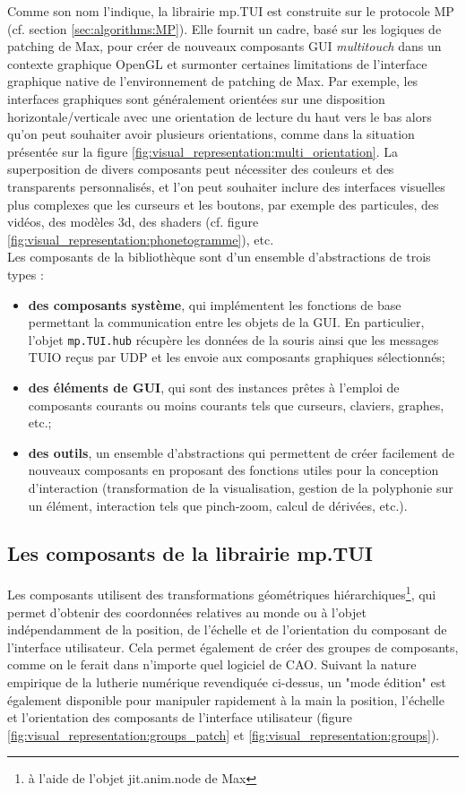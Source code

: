 \noindent Comme son nom l'indique, la librairie mp.TUI est construite sur le protocole MP (cf. section \ref{sec:algorithms:MP}). Elle fournit un cadre, basé sur les logiques de patching de Max, pour créer de nouveaux composants \gls{GUI} \textit{multitouch} dans un contexte graphique OpenGL et surmonter certaines limitations de l'interface graphique native de l'environnement de patching de Max. Par exemple, les interfaces graphiques sont généralement orientées sur une disposition horizontale/verticale avec une orientation de lecture du haut vers le bas alors qu'on peut souhaiter avoir plusieurs orientations, comme dans la situation présentée sur la figure \ref{fig:visual_representation:multi_orientation}. La superposition de divers composants peut nécessiter des couleurs et des transparents personnalisés, et l'on peut souhaiter inclure des interfaces visuelles plus complexes que les curseurs et les boutons, par exemple des particules, des vidéos, des modèles 3d, des shaders (cf. figure \ref{fig:visual_representation:phonetogramme}), etc.\\
\noindent Les composants de la bibliothèque sont d'un ensemble d'abstractions de trois types :
\vspace{-1em}
\begin{itemize}[noitemsep]
	\item \textbf{des composants système}, qui implémentent les fonctions de base permettant la communication entre les objets de la \gls{GUI}. En particulier, l'objet \verb|mp.TUI.hub| récupère les données de la souris ainsi que les messages \gls{TUIO} reçus par \gls{UDP} et les envoie aux composants graphiques sélectionnés;
	\item \textbf{des éléments de GUI}, qui sont des instances prêtes à l'emploi de composants courants ou moins courants tels que curseurs, claviers, graphes, etc.;
	\item \textbf{des outils}, un ensemble d'abstractions qui permettent de créer facilement de nouveaux composants en proposant des fonctions utiles pour la conception d'interaction (transformation de la visualisation, gestion de la polyphonie sur un élément, interaction tels que pinch-zoom, calcul de dérivées, etc.).
\end{itemize}

\subsection{Les composants de la librairie mp.TUI}

\noindent Les composants utilisent des transformations géométriques hiérarchiques\footnote{à l'aide de l'objet jit.anim.node de Max}, qui permet d'obtenir des coordonnées relatives au monde ou à l'objet indépendamment de la position, de l'échelle et de l'orientation du composant de l'interface utilisateur. Cela permet également de créer des groupes de composants, comme on le ferait dans n'importe quel logiciel de CAO. Suivant la nature empirique de la lutherie numérique revendiquée ci-dessus, un "mode édition" est également disponible pour manipuler rapidement à la main la position, l'échelle et l'orientation des composants de l'interface utilisateur (figure \ref{fig:visual_representation:groups_patch} et \ref{fig:visual_representation:groups}).


